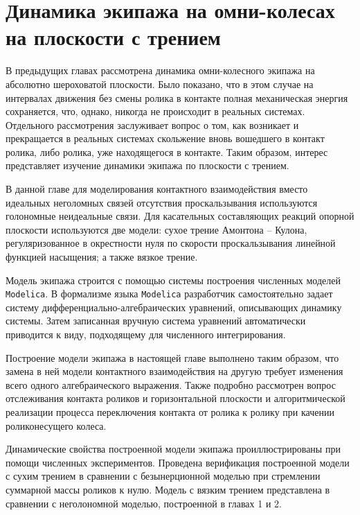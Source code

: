\chapter{Динамика экипажа на омни-колесах на плоскости с трением}


В предыдущих главах рассмотрена динамика омни-колесного экипажа на абсолютно шероховатой плоскости. Было показано, что в этом случае на интервалах движения без смены ролика в контакте полная механическая энергия сохраняется, что, однако, никогда не происходит в реальных системах.
Отдельного рассмотрения заслуживает вопрос о том, как возникает и прекращается в реальных системах скольжение вновь вошедшего в контакт ролика, либо ролика, уже находящегося в контакте.
Таким образом, интерес представляет изучение динамики экипажа по плоскости с трением.

В данной главе для моделирования контактного взаимодействия вместо идеальных неголомных связей отсутствия проскальзывания используются голономные неидеальные связи. Для касательных составляющих реакций опорной плоскости используются две модели: сухое трение Амонтона -- Кулона, регуляризованное в окрестности нуля по скорости проскальзывания линейной функцией насыщения; а также вязкое трение.

Модель экипажа строится с помощью системы построения численных моделей \texttt{Modelica}. В формализме языка \texttt{Modelica} разработчик самостоятельно задает систему дифференциально-алгебраи\-чес\-ких уравнений, описывающих динамику системы. Затем записанная вручную система уравнений автоматически приводится к виду, подходящему для численного интегрирования.

Построение модели экипажа в настоящей главе выполнено таким образом, что замена в ней модели контактного взаимодействия на другую требует изменения всего одного алгебраического выражения. Также подробно рассмотрен вопрос отслеживания контакта роликов и горизонтальной плоскости и алгоритмической реализации процесса переключения контакта от ролика к ролику при качении  роликонесущего колеса.

Динамические свойства построенной модели экипажа проиллюстрированы при помощи численных экспериментов. Проведена верификация построенной модели с сухим трением в сравнении с безынерционной моделью при стремлении суммарной массы роликов к нулю. Модель с вязким трением представлена в сравнении с неголономной моделью, построенной в главах 1 и 2.